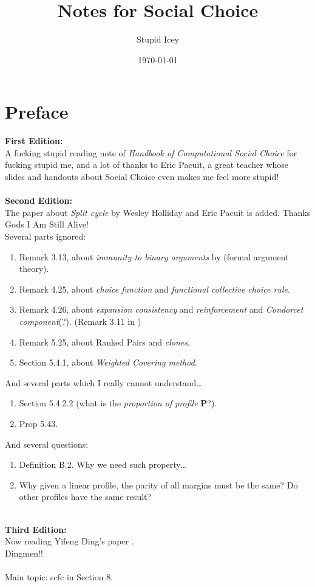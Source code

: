 \documentclass[a4paper,12pt,oneside]{book}
\title{Notes for Social Choice}
\author{Stupid Icey}
\date{\today}
\newcommand{\profile}{\mathbf{P}}
\begin{document}
\maketitle


\chapter*{Preface}

\textbf{First Edition:}\\
A fucking stupid reading note of \textit{Handbook of Computational Social Choice} \parencite{Moulin2016} for fucking stupid me, and a lot of thanks to Eric Pacuit, a great teacher whose slides and handouts about Social Choice even makes me feel more stupid!\\
~\\
\noindent \textbf{Second Edition:}\\
The paper about \emph{Split cycle} by Wesley Holliday and Eric Pacuit \parencite{Holliday2020} is added. Thanks Gods I Am Still Alive!\\
Several parts ignored:
\begin{enumerate}
  \item Remark 3.13, about \emph{immunity to binary arguments} by \textcite{Heitzig2002} (formal argument theory).
  \item Remark 4.25, about \emph{choice function} and \emph{functional collective choice rule}.
  \item Remark 4.26, about \emph{expansion consistency} and \emph{reinforcement} and \emph{Condorcet component}(?). (Remark 3.11 in \textcite{Ding2023})
  \item Remark 5.25, about Ranked Pairs and \emph{clones}.
  \item Section 5.4.1, about \emph{Weighted Covering method}.
\end{enumerate}

\noindent And several parts which I really cannot understand\dots
\begin{enumerate}
  \item Section 5.4.2.2 (what is the \emph{proportion of profile} $\profile$?).
  \item Prop 5.43.
\end{enumerate}

\noindent And several questions:
\begin{enumerate}
  \item Definition B.2. Why we need such property\dots
  \item Why given a linear profile, the parity of all margins must be the same? Do other profiles have the same result?
\end{enumerate}
~\\
\noindent \textbf{Third Edition:}\\
Now reading Yifeng Ding's paper \parencite{Ding2023}.\\
Dingmen!!\\
~\\
Main topic: scfc in Section 8.
\end{document}
